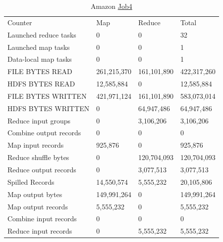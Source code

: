 \documentclass[paper=a4, fontsize=11pt]{scrartcl}	%
\numberwithin{equation}{section}															%
\numberwithin{figure}{section}																%
\numberwithin{table}{section}																%
\begin{document}
\begin{table}[!h]
	\centering
	\caption{Amazon \href{http://hadoop-compute0.di.univr.it:50030/jobdetails.jsp?jobid=job_201603141010_12299}{Job4}}
	\label{my-label}
	\begin{tabular}{llll}
		Counter&	Map&	Reduce&	Total\\
		Launched reduce tasks&	0&	0&	32\\
		Launched map tasks&	0&	0&	1\\
		Data-local map tasks&	0&	0&	1\\
		FILE BYTES READ&	261,215,370&	161,101,890&	422,317,260\\
		HDFS BYTES READ&	12,585,884&	0&	12,585,884\\
		FILE BYTES WRITTEN&	421,971,124&	161,101,890&	583,073,014\\
		HDFS BYTES WRITTEN&	0&	64,947,486&	64,947,486\\
		Reduce input groups&	0&	3,106,206&	3,106,206\\
		Combine output records&	0&	0&	0\\
		Map input records&	925,876&	0&	925,876\\
		Reduce shuffle bytes&	0&	120,704,093&	120,704,093\\
		Reduce output records&	0&	3,077,513&	3,077,513\\
		Spilled Records&	14,550,574	&5,555,232&	20,105,806\\
		Map output bytes&	149,991,264&	0&	149,991,264\\
		Map output records&	5,555,232&	0&	5,555,232\\
		Combine input records&	0&	0&	0\\
		Reduce input records&	0&	5,555,232&	5,555,232\\
	\end{tabular}
\end{table}
\end{document}
